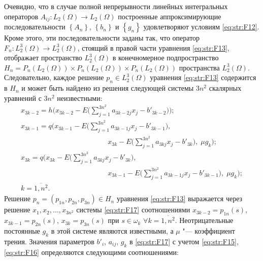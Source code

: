 Очевидно, что в случае полной непрерывности линейных интегральных операторов $A_{ij} \colon L_{2} (\Omega)\to L_{2} (\Omega)$ построенные аппроксимирующие последовательности $\left\{A_{n} \right\}$, $\left\{b_{n} \right\}$ и $\left\{g_{n} \right\}$ удовлетворяют условиям \eqref{eq:str:F12}.
Кроме этого, эти последовательности заданы так, что оператор $F_{n} \colon L_{2}^{3} (\Omega)\to L_{2}^{3} (\Omega)$, стоящий в правой части уравнения \eqref{eq:str:F13}, отображает пространство $L_{2}^{3} (\Omega)$ в конечномерное подпространство $H_{n} =P_{n} \left(L_{2} (\Omega)\right)\times P_{n} \left(L_{2} (\Omega)\right)\times P_{n} \left(L_{2} (\Omega)\right)$ пространства $L_{2}^{3} (\Omega)$.
Следовательно, каждое решение $p_{n} \in L_{2}^{3} (\Omega)$ уравнения \eqref{eq:str:F13} содержится в $H_{n} $ и может быть найдено из решения следующей системы $3n^{2} $ скалярных уравнений с $3n^{2} $ неизвестными:
\begin{equation} \label{eq:str:F17} 
\begin{array}{l} 
\displaystyle 
x_{3k-2} =h\biggl( x_{3k-2} -E \biggl(\sum _{j=1}^{3n^{2} }a_{3k-2j}   x_{j} -b'_{3k-2}  \biggr)\biggr); \\ \displaystyle
x_{3k-1} =q\biggl(x_{3k-1} -E \biggl(\sum _{j=1}^{3n^{2} }a_{3k-1j}  x_{j} -b'_{3k-1}  \biggr),  
\\ 
\displaystyle \mspace{220mu} 
x_{3k} -E \biggl(\sum _{j=1}^{3n^{2} }a_{3kj}  x_{j} -b'_{3k} \biggr), 
\; \mu g_{k} \biggr); 
\\ 
\displaystyle
x_{3k} =q\biggl(x_{3k} -E\biggl(\sum _{j=1}^{3n^{2} }a_{3kj}   x_{j} -b'_{3k}  \biggr), 
\\ 
\displaystyle \mspace{220mu} 
x_{3k-1} -E\biggl (\sum _{j=1}^{3n^{2} }a_{3k-1j}  x_{j} -b'_{3k-1}  \biggr),\; \mu g_{k} \biggr);
\\
k=\overline{1 ,n^{2} }. 
\end{array}
 \end{equation} 
Решение  $p_{n}=\left(p_{1n} ,p_{2n} ,p_{3n} \right)\in H_{n} $ уравнения \eqref{eq:str:F13} выражается через  решение $x_{1} ,x_{2} , \dots, x_{3n^{2} } $  системы \eqref{eq:str:F17}  соотношениями 
$x_{3k-2} =p_{1n} (s)$, $x_{3k-1} =p_{2n} (s)$, $x_{3k} =p_{3n} (s)$ при $s\in \omega _{k}$ $\forall k=\overline{1, n^{2} }$.
Неотрицательные постоянные $g_{k} $ в этой системе являются известными, а $\mu $ "--- коэффициент трения.
Значения параметров $b'_{i}$, $a_{ij}$, $g_{k} $ в \eqref{eq:str:F17} с учетом \eqref{eq:str:F15}, \eqref{eq:str:F16} определяются следующими соотношениями:
